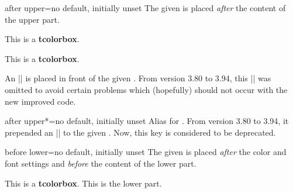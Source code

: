 \begin{docTcbKey}[][doc updated=2016-10-21]{after upper}{=}{no default, initially unset}
  The given  is placed \emph{after} the content of the upper part.
\begin{dispExample}

\begin{tcolorbox}[title=My title]
This is a \textbf{tcolorbox}.
\end{tcolorbox}
\end{dispExample}

\begin{dispExample}
\begin{tcolorbox}[before upper=\flqq,after upper=\frqq,
  colback=red!5!white,colframe=red!75!black]
This is a \textbf{tcolorbox}.
\end{tcolorbox}
\end{dispExample}

\begin{marker}
An |\unskip| is placed in front of the given .
From version 3.80 to 3.94, this |\unskip| was omitted to avoid certain
problems which (hopefully) should not occur with the new improved code.
\end{marker}

\end{docTcbKey}

\begin{docTcbKey}[][doc new and updated={2016-10-21}{2016-10-21}]{after upper*}{=}{no default, initially unset}
  Alias for .
  From version 3.80 to 3.94, it prepended an |\unskip| to the given .
  Now, this key is considered to be deprecated.
\end{docTcbKey}


\clearpage
\begin{docTcbKey}{before lower}{=}{no default, initially unset}
  The given  is placed \emph{after} the color and font settings
  and \emph{before} the content of the lower part.
\begin{dispExample}

\begin{tcolorbox}
This is a \textbf{tcolorbox}.
\tcblower
This is the lower part.
\end{tcolorbox}
\end{dispExample}
\end{docTcbKey}


